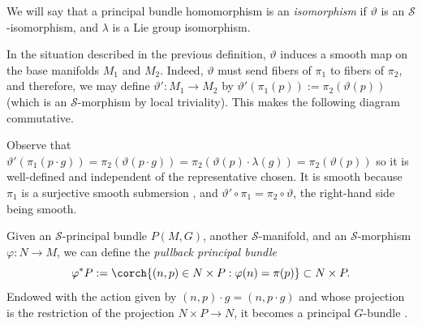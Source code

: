 We will say that a principal bundle homomorphism is an \textit{isomorphism} if \(\vartheta\) is an \(\mathcal{S}\)-isomorphism, and \(\lambda\) is a Lie group isomorphism. 

\noindent\begin{minipage}{0.75\textwidth}
In the situation described in the previous definition, \(\vartheta\) induces a smooth map on the base manifolds \(M_1\) and \(M_2\). Indeed, \(\vartheta\) must send fibers of \(\pi_1\) to fibers of \(\pi_2\), and therefore, we may define \(\vartheta'\colon M_1 \to M_2\) by \(\vartheta'(\pi_1(p)):=\pi_2(\vartheta(p))\) (which is an \(\mathcal{S}\)-morphism by local triviality). This makes the following diagram commutative.
\end{minipage}
\begin{minipage}{0.22\textwidth}
        \begin{center}
        \end{center}
\end{minipage} 

Observe that \(\vartheta'(\pi_1(p\cdot g))=\pi_2(\vartheta(p\cdot g))=\pi_2(\vartheta(p)\cdot \lambda(g))=\pi_2(\vartheta(p))\) so it is well-defined and independent of the representative chosen. It is smooth because \(\pi_1\) is a surjective smooth submersion \parencite[Th. 4.29]{lee_introSM}, and \(\vartheta'\circ \pi_1=\pi_2 \circ \vartheta\), the right-hand side being smooth.

Given an \(\mathcal{S}\)-principal bundle \(P(M,G)\), another \(\mathcal{S}\)-manifold, and an \(\mathcal{S}\)-morphism \(\varphi\colon N\to M\), we can define the \textit{pullback principal bundle}
\begin{equation} \label{eq_def_pullback}
\varphi^* P:=\corch{(n,p)\in N \times P: \varphi(n)=\pi(p)} \subset N \times P.
\end{equation}
Endowed with the action given by \((n, p)\cdot g=(n, p\cdot g)\) and whose projection is the restriction of the projection \(N \times P \to N\), it becomes a principal \(G\)-bundle \parencite[Remark 1.1.9]{Rudolph_2017pug}. 

